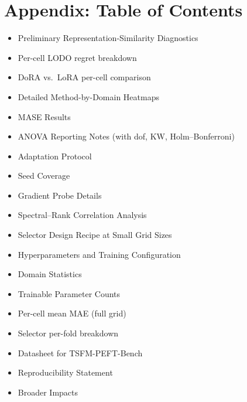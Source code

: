 \documentclass{article}
\begin{document}
\section*{Appendix: Table of Contents}
\begin{itemize}[nosep,leftmargin=*]
\item[\ref{sec:cka-appendix}.] Preliminary Representation-Similarity Diagnostics
\item[\ref{sec:lodo-regret-app}.] Per-cell LODO regret breakdown
\item[\ref{sec:dora-app}.] DoRA vs.\ LoRA per-cell comparison
\item[\ref{sec:heatmaps}.] Detailed Method-by-Domain Heatmaps
\item[\ref{sec:mase}.] MASE Results
\item[\ref{sec:anova-detail}.] ANOVA Reporting Notes (with dof, KW, Holm--Bonferroni)
\item[\ref{sec:app-protocol}.] Adaptation Protocol
\item[\ref{sec:seed-cov}.] Seed Coverage
\item[\ref{sec:gradient-probe}.] Gradient Probe Details
\item[\ref{sec:spectral-rank}.] Spectral--Rank Correlation Analysis
\item[\ref{sec:design-recipe}.] Selector Design Recipe at Small Grid Sizes
\item[\ref{sec:hyperparams}.] Hyperparameters and Training Configuration
\item[\ref{sec:domain-stats}.] Domain Statistics
\item[\ref{sec:params}.] Trainable Parameter Counts
\item[\ref{sec:per-cell-mae}.] Per-cell mean MAE (full grid)
\item[\ref{sec:selector-fold}.] Selector per-fold breakdown
\item[\ref{sec:datasheet}.] Datasheet for TSFM-PEFT-Bench
\item[\ref{sec:repro}.] Reproducibility Statement
\item[\ref{sec:broader}.] Broader Impacts
\end{itemize}



\clearpage

\end{document}
